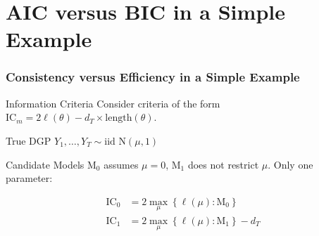 \section{AIC versus BIC in a Simple Example}
\begin{frame}
  \frametitle{Consistency versus Efficiency in a Simple Example}

  \begin{block}{Information Criteria}
    Consider criteria of the form $\text{IC}_m = 2\ell(\theta) - d_T \times \text{length}(\theta)$.
  \end{block}
  
  
  \begin{block}{True DGP}
  $Y_{1}, \dots, Y_T \sim \mbox{iid N}(\mu, 1)$
  \end{block}

  \pause

  \begin{block}{Candidate Models}
    $\text{M}_0$ assumes $\mu = 0$, $\text{M}_1$ does not restrict $\mu$. Only one parameter:

    \vspace{-1em}
  \begin{align*}
    \text{IC}_0 &= 2 \max_\mu \left\{ \ell(\mu) \colon \text{M}_0 \right\} \\ 
    \text{IC}_1 &= 2 \max_\mu \left\{ \ell(\mu) \colon \text{M}_1 \right\} - d_T
  \end{align*}
  \end{block}


\end{frame}

